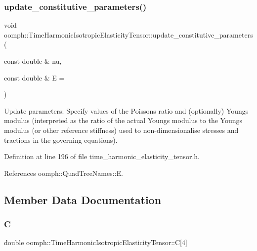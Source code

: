 \subsubsection{\texorpdfstring{update\+\_\+constitutive\+\_\+parameters()}{update\_constitutive\_parameters()}}
{\footnotesize\ttfamily void oomph\+::\+Time\+Harmonic\+Isotropic\+Elasticity\+Tensor\+::update\+\_\+constitutive\+\_\+parameters (\begin{DoxyParamCaption}\item[{const double \&}]{nu,  }\item[{const double \&}]{E = {} }\end{DoxyParamCaption})\hspace{0.3cm}{\ttfamily [inline]}}



Update parameters\+: Specify values of the Poisson\textquotesingle{}s ratio and (optionally) Young\textquotesingle{}s modulus (interpreted as the ratio of the actual Young\textquotesingle{}s modulus to the Young\textquotesingle{}s modulus (or other reference stiffness) used to non-\/dimensionalise stresses and tractions in the governing equations). 



Definition at line 196 of file time\+\_\+harmonic\+\_\+elasticity\+\_\+tensor.\+h.



References oomph\+::\+Quad\+Tree\+Names\+::E.



\subsection{Member Data Documentation}
\mbox{\label{classoomph_1_1TimeHarmonicIsotropicElasticityTensor_afa7b0b518e23a6cc069b1618033b4947}} 
\subsubsection{\texorpdfstring{C}{C}}
{\footnotesize\ttfamily double oomph\+::\+Time\+Harmonic\+Isotropic\+Elasticity\+Tensor\+::C\mbox{[}4\mbox{]}\hspace{0.3cm}{\ttfamily [private]}}



